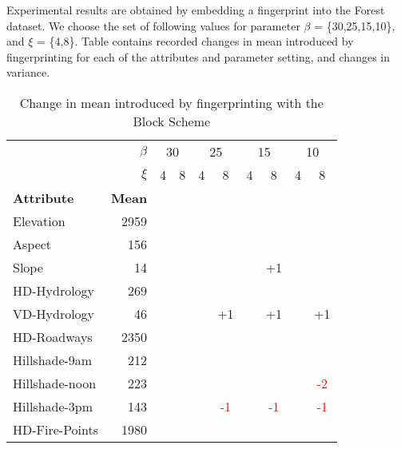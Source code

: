 Experimental results are obtained by embedding a fingerprint into the Forest dataset. 
We choose the set of following values for parameter $\beta$ = \{30,25,15,10\}, and $\xi$ = \{4,8\}. 
Table  contains recorded changes in mean introduced by fingerprinting for each of the attributes and parameter setting, and  changes in variance.
\begin{table}[h]
\centering
\caption{Change in mean introduced by fingerprinting with the Block Scheme}
\label{table:block-mean}
\begin{tabular}{|l r|c c| c c| c c| c c|} 
 \hline
 & $\beta$ & \multicolumn{2}{c|}{30} & \multicolumn{2}{c|}{25} & \multicolumn{2}{c|}{15} & \multicolumn{2}{c|}{10} \\ 
 & $\xi$ &4&8&4&8&4&8&4&8\\
 \textbf{Attribute} & \textbf{Mean} & & & & & & & & \\
 \hline
 Elevation & 2959 &  &  &  &  &  &  &  & \\
 \hline
 Aspect & 156 &  &  &  &  &  &  &  & \\
 \hline
 Slope & 14 &  &  &  &  &  & +1 &  & \\
 \hline
 HD-Hydrology & 269 &  &  &  &  &  &  &  & \\
 \hline
 VD-Hydrology & 46 &  &  &  & +1 &  & +1 &  & +1\\
 \hline
 HD-Roadways & 2350 &  &  &  &  &  &  &  & \\
 \hline
 Hillshade-9am & 212 &  &  &  &  &  &  &  & \\
 \hline
 Hillshade-noon & 223 &  &  &  &  &  &  &  & \textcolor{red}{-2}\\
 \hline
 Hillshade-3pm & 143 &  &  &  & \textcolor{red}{-1} &  & \textcolor{red}{-1} &  & \textcolor{red}{-1}\\
 \hline
 HD-Fire-Points & 1980 &  &  &  &  &  &  &  & \\
 \hline
\end{tabular}
\end{table}

